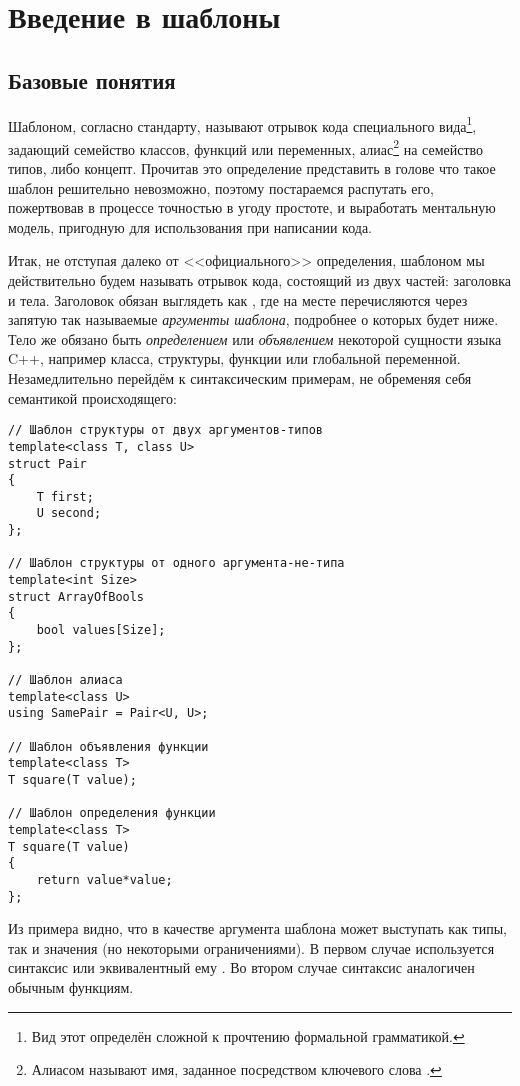 \chapter{Введение в шаблоны}
\section{Базовые понятия}
Шаблоном, согласно стандарту, называют отрывок кода специального вида\footnote{Вид этот определён сложной к прочтению формальной грамматикой.}, задающий семейство классов, функций или переменных, алиас\footnote{Алиасом называют имя, заданное посредством ключевого слова .} на семейство типов, либо концепт. Прочитав это определение представить в голове что такое шаблон решительно невозможно, поэтому постараемся распутать его, пожертвовав в процессе точностью в угоду простоте, и выработать ментальную модель, пригодную для использования при написании кода.

Итак, не отступая далеко от <<официального>> определения, шаблоном мы действительно будем называть отрывок кода, состоящий из двух частей: заголовка и тела. Заголовок обязан выглядеть как , где на месте  перечисляются через запятую так называемые \textit{аргументы шаблона}, подробнее о которых будет ниже. Тело же обязано быть \textit{определением} или \textit{объявлением} некоторой сущности языка C++, например класса, структуры, функции или глобальной переменной. Незамедлительно перейдём к синтаксическим примерам, не обременяя себя семантикой происходящего:
\begin{verbatim}
// Шаблон структуры от двух аргументов-типов
template<class T, class U>
struct Pair
{
    T first;
    U second;
};

// Шаблон структуры от одного аргумента-не-типа
template<int Size>
struct ArrayOfBools
{
    bool values[Size];
};

// Шаблон алиаса
template<class U>
using SamePair = Pair<U, U>;

// Шаблон объявления функции
template<class T>
T square(T value);

// Шаблон определения функции
template<class T>
T square(T value)
{
    return value*value;
};
\end{verbatim}
Из примера видно, что в качестве аргумента шаблона может выступать как типы, так и значения (но некоторыми ограничениями). В первом случае используется синтаксис  или эквивалентный ему . Во втором случае синтаксис аналогичен обычным функциям.
